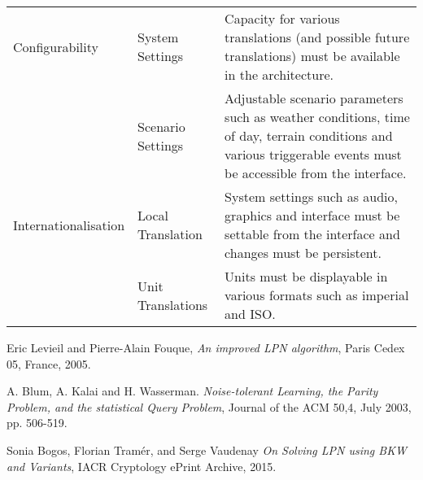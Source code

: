 \documentclass{article}
\begin{document}
\begin{sidewaystable}
\begin{tabular}{ @{} l l >{\raggedright\arraybackslash}p{9.5cm} @{} }
\\
\midrule
Configurability
  & System Settings
  & Capacity for various translations (and possible future translations) must be
    available in the architecture.
\\\addlinespace
  & Scenario Settings
  & Adjustable scenario parameters such as weather conditions, time of day, terrain
    conditions and various triggerable events must be accessible from the interface.
\\
\midrule
Internationalisation
  & Local Translation
  & System settings such as audio, graphics and interface must be settable from the
    interface and changes must be persistent.
\\\addlinespace
  & Unit Translations
  & Units must be displayable in various formats such as imperial and ISO.
\\
\bottomrule
\end{tabular}
\end{sidewaystable}
 


\begin{thebibliography}{9}

  Eric Levieil and Pierre-Alain Fouque,
  \emph{An improved LPN algorithm},
  Paris Cedex 05, France, 2005.
  
  A. Blum, A. Kalai and H. Wasserman.
  \emph{Noise-tolerant Learning, the Parity Problem, and the statistical Query Problem},
  Journal of the ACM 50,4, July 2003, pp. 506-519.
  
  Sonia Bogos, Florian Tramér, and Serge Vaudenay
  \emph{On Solving LPN using BKW and Variants},
  {IACR} Cryptology ePrint Archive, 2015.  
  

\end{thebibliography}
 
\end{document}
